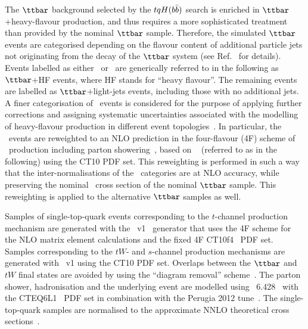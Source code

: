 The $\ttbar$ background selected by the $tqH(b\bar{b})$ search is enriched in $\ttbar$+heavy-flavour production, and thus requires a more sophisticated 
treatment than provided by the nominal $\ttbar$ sample. 
Therefore, the simulated $\ttbar$ events are categorised depending 
on the flavour content of additional particle jets not originating from the decay of the $\ttbar$ system (see Ref.~\cite{Aaboud:2017rss} for details).
Events labelled as either \ttbin\ or \ttcin\ are generically referred to in the following as $\ttbar$+HF events, where HF stands for ``heavy flavour''.
The remaining events are labelled as $\ttbar$+light-jets events, including those with no additional jets. 
A finer categorisation of \ttbin\ events is considered for the purpose of applying further corrections and
assigning systematic uncertainties associated with the modelling of heavy-flavour production in different event topologies~\cite{Aaboud:2017rss}.
In particular, the \ttbin\ events are reweighted to an NLO prediction in the four-flavour (4F) scheme 
of \ttbin\ production including parton showering~\cite{Cascioli:2013era}, based on {\ShOLlong}~\cite{Gleisberg:2008ta, Cascioli:2011va} (referred to as {\ShOL} 
in the following) using the CT10 PDF set.  This reweighting is performed in such a way that the inter-normalisations of the \ttbin\ categories are at NLO accuracy, 
while preserving the nominal \ttbin\ cross section of the nominal $\ttbar$ sample. This reweighting is applied to the alternative $\ttbar$ samples as well.

Samples of single-top-quark events corresponding to the $t$-channel production mechanism are generated with the 
{\powheg}~v1~\cite{Frederix:2012dh} generator that uses the 4F scheme  for the NLO matrix element calculations
and the fixed 4F \textsc{CT10}f\textsc{4}~\cite{Lai:2010vv} PDF set.
Samples corresponding to the $tW$- and $s$-channel production mechanisms are generated 
with {\powheg}~v1 using the CT10 PDF set. Overlaps between the $\ttbar$ and $tW$ final states are avoided by using 
the ``diagram removal'' scheme~\cite{Frixione:2005vw}.
The parton shower, hadronisation and the underlying event are modelled using {\pythia}~6.428~\cite{Sjostrand:2006za} 
with the CTEQ6L1~\cite{Pumplin:2002vw,Nadolsky:2008zw} PDF set 
in combination with the Perugia 2012 tune~\cite{Skands:2010ak}.
The single-top-quark samples are normalised to the approximate NNLO theoretical cross 
sections~\cite{Kidonakis:2011wy,Kidonakis:2010ux,Kidonakis:2010tc}. 


